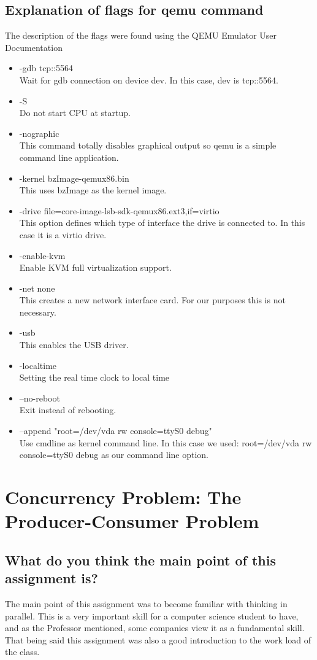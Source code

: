 \documentclass[letterpaper,10pt,titlepage,draftclsnofoot,onecolumn]{IEEEtran}
\begin{document}
\subsection{Explanation of flags for qemu command}
The description of the flags were found using the QEMU Emulator User Documentation \cite{qemu}
\begin{itemize}
\item -gdb tcp::5564 \\
Wait for gdb connection on device dev. In this case, dev is tcp::5564.
\item -S \\
Do not start CPU at startup.
\item -nographic \\
This command totally disables graphical output so qemu is a simple command line application. 
\item -kernel bzImage-qemux86.bin \\
This uses bzImage as the kernel image.
\item -drive file=core-image-lsb-sdk-qemux86.ext3,if=virtio \\
This option defines which type of interface the drive is connected to. In this case it is a virtio drive. 
\item -enable-kvm \\
Enable KVM full virtualization support.
\item -net none \\
This creates a new network interface card. For our purposes this is not necessary.
\item -usb \\ 
This enables the USB driver.
\item -localtime \\ 
Setting the real time clock to local time
\item --no-reboot \\
Exit instead of rebooting.
\item --append "root=/dev/vda rw console=ttyS0 debug" \\
Use cmdline as kernel command line. In this case we used: root=/dev/vda rw console=ttyS0 debug as our command line option.
\end{itemize}

\section{Concurrency Problem: The Producer-Consumer Problem}
\subsection{What do you think the main point of this assignment is?}
The main point of this assignment was to become familiar with thinking in parallel. This is a very important skill for a computer science student to have, and as the Professor mentioned, some companies view it as a fundamental skill. That being said this assignment was also a good introduction to the work load of the class. 
\end{document}
